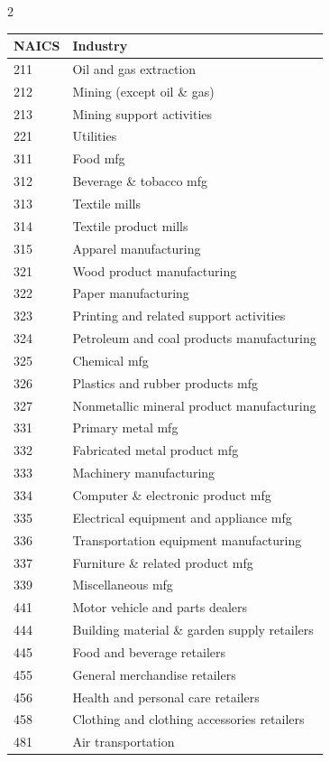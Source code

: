{\footnotesize
\begin{multicols}{2}
\begin{tabular}{ll}
\textbf{NAICS} & \textbf{Industry}\\
\midrule
211 & Oil and gas extraction \\
212 & Mining (except oil \& gas) \\
213 & Mining support activities \\
221 & Utilities \\
311 & Food mfg \\
312 & Beverage \& tobacco mfg \\
313 & Textile mills \\
314 & Textile product mills \\
315 & Apparel manufacturing \\
321 & Wood product manufacturing \\
322 & Paper manufacturing \\
323 & Printing and related support activities \\
324 & Petroleum and coal products manufacturing \\
325 & Chemical mfg \\
326 & Plastics and rubber products mfg \\
327 & Nonmetallic mineral product manufacturing \\
331 & Primary metal mfg \\
332 & Fabricated metal product mfg \\
333 & Machinery manufacturing \\
334 & Computer \& electronic product mfg \\
335 & Electrical equipment  and appliance mfg \\
336 & Transportation equipment manufacturing \\
337 & Furniture \& related product mfg \\
339 & Miscellaneous mfg \\
441 & Motor vehicle and parts dealers \\
444 & Building material \& garden supply retailers \\
445 & Food and beverage retailers \\
455 & General merchandise retailers \\
456 & Health and personal care retailers \\
458 & Clothing and clothing accessories retailers \\
481 & Air transportation \\

\end{tabular}
\end{multicols}}
